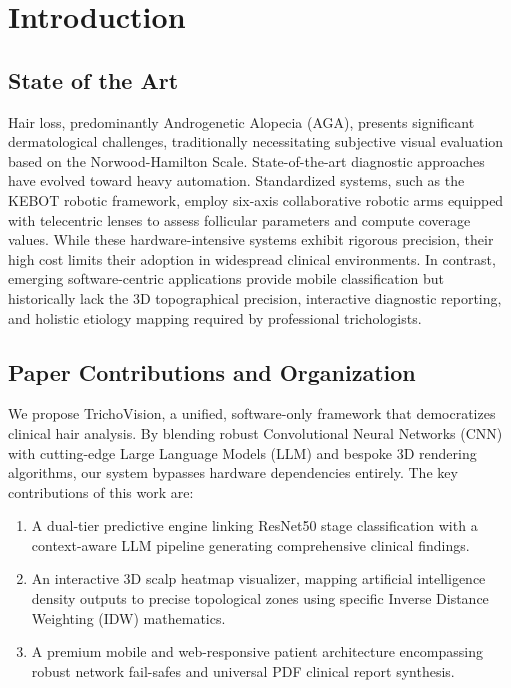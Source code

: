 \documentclass[12pt, a4paper]{article}
\begin{document}
\section{Introduction}

\subsection{State of the Art}
Hair loss, predominantly Androgenetic Alopecia (AGA), presents significant dermatological challenges, traditionally necessitating subjective visual evaluation based on the Norwood-Hamilton Scale. State-of-the-art diagnostic approaches have evolved toward heavy automation. Standardized systems, such as the KEBOT robotic framework, employ six-axis collaborative robotic arms equipped with telecentric lenses to assess follicular parameters and compute coverage values. While these hardware-intensive systems exhibit rigorous precision, their high cost limits their adoption in widespread clinical environments. In contrast, emerging software-centric applications provide mobile classification but historically lack the 3D topographical precision, interactive diagnostic reporting, and holistic etiology mapping required by professional trichologists.

\subsection{Paper Contributions and Organization}
We propose TrichoVision, a unified, software-only framework that democratizes clinical hair analysis. By blending robust Convolutional Neural Networks (CNN) with cutting-edge Large Language Models (LLM) and bespoke 3D rendering algorithms, our system bypasses hardware dependencies entirely. The key contributions of this work are:
\begin{enumerate}
    \item A dual-tier predictive engine linking ResNet50 stage classification with a context-aware LLM pipeline generating comprehensive clinical findings.
    \item An interactive 3D scalp heatmap visualizer, mapping artificial intelligence density outputs to precise topological zones using specific Inverse Distance Weighting (IDW) mathematics.
    \item A premium mobile and web-responsive patient architecture encompassing robust network fail-safes and universal PDF clinical report synthesis.
\end{enumerate}
\end{document}
